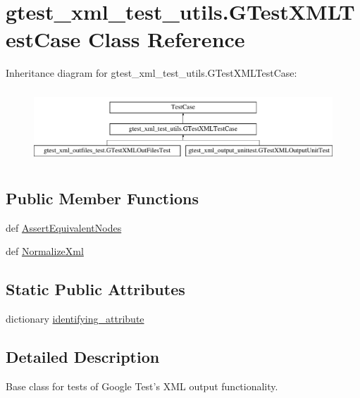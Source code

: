\hypertarget{classgtest__xml__test__utils_1_1_g_test_x_m_l_test_case}{\section{gtest\-\_\-xml\-\_\-test\-\_\-utils.\-G\-Test\-X\-M\-L\-Test\-Case Class Reference}
\label{classgtest__xml__test__utils_1_1_g_test_x_m_l_test_case}
}
Inheritance diagram for gtest\-\_\-xml\-\_\-test\-\_\-utils.\-G\-Test\-X\-M\-L\-Test\-Case\-:\begin{figure}[H]
\begin{center}
\leavevmode
\includegraphics[height=2.781457cm]{classgtest__xml__test__utils_1_1_g_test_x_m_l_test_case}
\end{center}
\end{figure}
\subsection*{Public Member Functions}
\begin{DoxyCompactItemize}
\item 
def \hyperlink{classgtest__xml__test__utils_1_1_g_test_x_m_l_test_case_aa9870c94fd69ef82f102dbd51eaf32b3}{Assert\-Equivalent\-Nodes}
\item 
def \hyperlink{classgtest__xml__test__utils_1_1_g_test_x_m_l_test_case_a9daed073a0d6d82c5f7b58b10683db28}{Normalize\-Xml}
\end{DoxyCompactItemize}
\subsection*{Static Public Attributes}
\begin{DoxyCompactItemize}
\item 
dictionary \hyperlink{classgtest__xml__test__utils_1_1_g_test_x_m_l_test_case_a0e3a4e84e18f29d2248dcd670a0a6ae6}{identifying\-\_\-attribute}
\end{DoxyCompactItemize}


\subsection{Detailed Description}
\begin{DoxyVerb}Base class for tests of Google Test's XML output functionality.
\end{DoxyVerb}
 

